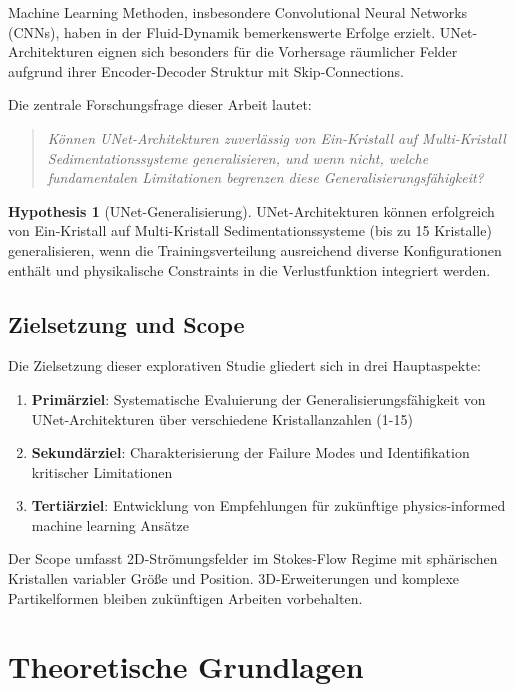 \documentclass[12pt,twoside,openright]{scrreprt}
\theoremstyle{definition}
\newtheorem{hypothesis}{Hypothesis}[chapter]
\theoremstyle{plain}
\begin{document}
	Machine Learning Methoden, insbesondere Convolutional Neural Networks (CNNs), haben in der Fluid-Dynamik bemerkenswerte Erfolge erzielt. UNet-Architekturen eignen sich besonders für die Vorhersage räumlicher Felder aufgrund ihrer Encoder-Decoder Struktur mit Skip-Connections.
	
	Die zentrale Forschungsfrage dieser Arbeit lautet:
	
	\begin{quote}
		\textit{Können UNet-Architekturen zuverlässig von Ein-Kristall auf Multi-Kristall Sedimentationssysteme generalisieren, und wenn nicht, welche fundamentalen Limitationen begrenzen diese Generalisierungsfähigkeit?}
	\end{quote}
	
	\begin{hypothesis}[UNet-Generalisierung]
		\label{hyp:generalization}
		UNet-Architekturen können erfolgreich von Ein-Kristall auf Multi-Kristall Sedimentationssysteme (bis zu 15 Kristalle) generalisieren, wenn die Trainingsverteilung ausreichend diverse Konfigurationen enthält und physikalische Constraints in die Verlustfunktion integriert werden.
	\end{hypothesis}
	
	\section{Zielsetzung und Scope}
	
	Die Zielsetzung dieser explorativen Studie gliedert sich in drei Hauptaspekte:
	
	\begin{enumerate}
		\item \textbf{Primärziel}: Systematische Evaluierung der Generalisierungsfähigkeit von UNet-Architekturen über verschiedene Kristallanzahlen (1-15)
		\item \textbf{Sekundärziel}: Charakterisierung der Failure Modes und Identifikation kritischer Limitationen
		\item \textbf{Tertiärziel}: Entwicklung von Empfehlungen für zukünftige physics-informed machine learning Ansätze
	\end{enumerate}
	
	Der Scope umfasst 2D-Strömungsfelder im Stokes-Flow Regime mit sphärischen Kristallen variabler Größe und Position. 3D-Erweiterungen und komplexe Partikelformen bleiben zukünftigen Arbeiten vorbehalten.
	
	\chapter{Theoretische Grundlagen}
	\label{ch:theory}
	
\end{document}
